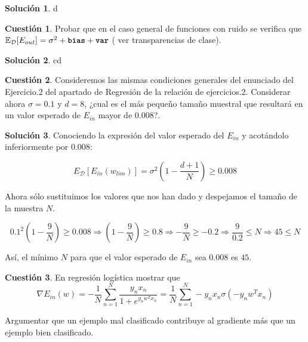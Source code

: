 \documentclass[a4paper, 11pt]{article}
\theoremstyle{definition}
\newtheorem{cuestion}{Cuestión}
\newtheorem*{solucion}{Solución}
\begin{document}
  \begin{solucion}
    d
  \end{solucion}

  \begin{cuestion}
    Probar que en el caso general de funciones con ruido se verifica que $\mathbb{E}_{\mathcal{D}}[E_{out}]= \sigma^2+\texttt{\textbf{bias}}+\texttt{\textbf{var}}$ ( ver transparencias de clase).

  \end{cuestion}

  \begin{solucion}
    cd
  \end{solucion}

  \begin{cuestion}
    Consideremos las mismas condiciones generales del enunciado del Ejercicio.2 del apartado de Regresión de la relación de ejercicios.2.
    Considerar ahora $\sigma=0.1$ y $d=8$, ¿cual es el más pequeño tamaño muestral que resultará en un valor esperado de $E_{in}$ mayor de $0.008$?.
  \end{cuestion}


  \begin{solucion}
    Conociendo la expresión del valor esperado del $E_{in}$ y acotándolo inferiormente por $0.008$:

    $$E_{\mathcal{D}} \left[ E_{in}(w_{lim})\right] = \sigma^2 \left(1 - \frac{d+1}{N}\right) \geq 0.008$$

    Ahora sólo sustituimos los valores que nos han dado y despejamos el tamaño de la muestra $N$.

    $$0.1^2 \left(1 - \frac{9}{N}\right) \geq 0.008 \Rightarrow \left(1 - \frac{9}{N}\right) \geq 0.8 \Rightarrow -\frac{9}{N} \geq -0.2 \Rightarrow \frac{9}{0.2} \leq N \Rightarrow 45 \leq N$$

    Así, el mínimo $N$ para que el valor esperado de $E_{in}$ sea $0.008$ es $45$.
  \end{solucion}

  \begin{cuestion}
    En regresión logística mostrar que
    \[
    \nabla E_{in}(w)=-\frac{1}{N}\sum_{n=1}^{N}\frac{y_nx_n}{1+e^{y_nw^Tx_n}}= \frac{1}{N}\sum_{n=1}^{N}-y_nx_n\sigma(-y_nw^Tx_n)
    \]

    Argumentar que un ejemplo mal clasificado contribuye  al gradiente más que un ejemplo bien clasificado.
  \end{cuestion}
\end{document}
